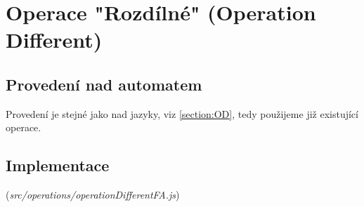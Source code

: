 \section{Operace "Rozdílné" (Operation Different)}
\subsection{Provedení nad automatem}
Provedení je stejné jako nad jazyky, viz \ref{section:OD}, tedy použijeme již existující operace.
\subsection{Implementace}
(\textit{src/operations/operationDifferentFA.js})
